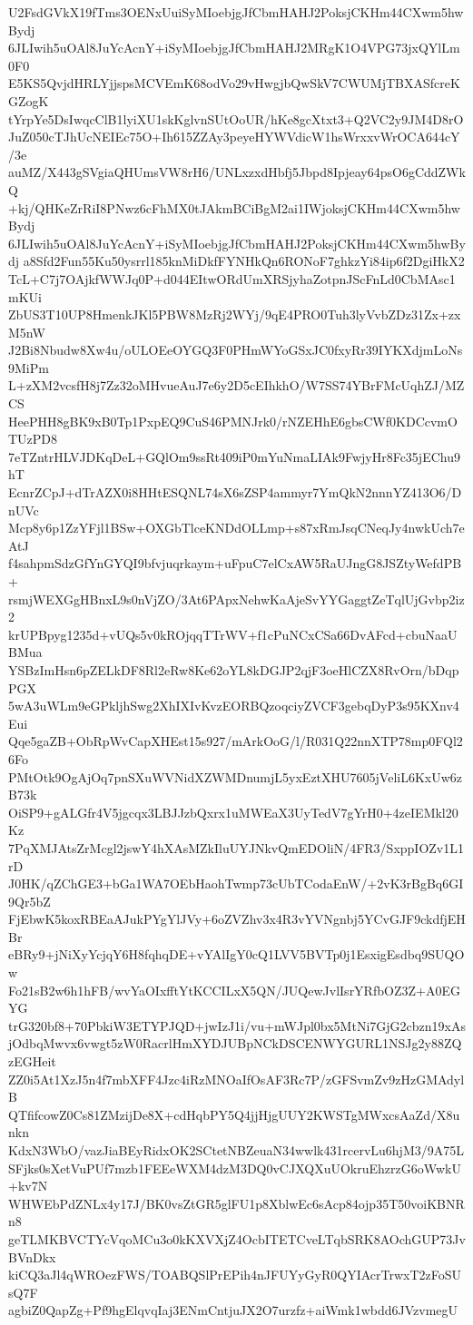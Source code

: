 U2FsdGVkX19fTms3OENxUuiSyMIoebjgJfCbmHAHJ2PoksjCKHm44CXwm5hwBydj
6JLIwih5uOAl8JuYcAcnY+iSyMIoebjgJfCbmHAHJ2MRgK1O4VPG73jxQYlLm0F0
E5KS5QvjdHRLYjjspsMCVEmK68odVo29vHwgjbQwSkV7CWUMjTBXASfcreKGZogK
tYrpYe5DsIwqcClB1lyiXU1skKglvnSUtOoUR/hKe8gcXtxt3+Q2VC2y9JM4D8rO
JuZ050cTJhUcNEIEc75O+Ih615ZZAy3peyeHYWVdicW1hsWrxxvWrOCA644cY/3e
auMZ/X443gSVgiaQHUmsVW8rH6/UNLxzxdHbfj5Jbpd8Ipjeay64psO6gCddZWkQ
+kj/QHKeZrRiI8PNwz6cFhMX0tJAkmBCiBgM2ai1IWjoksjCKHm44CXwm5hwBydj
6JLIwih5uOAl8JuYcAcnY+iSyMIoebjgJfCbmHAHJ2PoksjCKHm44CXwm5hwBydj
a8Sfd2Fun55Ku50ysrrl185knMiDkfFYNHkQn6RONoF7ghkzYi84ip6f2DgiHkX2
TcL+C7j7OAjkfWWJq0P+d044EItwORdUmXRSjyhaZotpnJScFnLd0CbMAsc1mKUi
ZbUS3T10UP8HmenkJKl5PBW8MzRj2WYj/9qE4PRO0Tuh3lyVvbZDz31Zx+zxM5nW
J2Bi8Nbudw8Xw4u/oULOEeOYGQ3F0PHmWYoGSxJC0fxyRr39IYKXdjmLoNs9MiPm
L+zXM2vcsfH8j7Zz32oMHvueAuJ7e6y2D5cEIhkhO/W7SS74YBrFMcUqhZJ/MZCS
HeePHH8gBK9xB0Tp1PxpEQ9CuS46PMNJrk0/rNZEHhE6gbsCWf0KDCcvmOTUzPD8
7eTZntrHLVJDKqDeL+GQlOm9ssRt409iP0mYuNmaLIAk9FwjyHr8Fc35jEChu9hT
EcnrZCpJ+dTrAZX0i8HHtESQNL74sX6sZSP4ammyr7YmQkN2nnnYZ413O6/DnUVc
Mcp8y6p1ZzYFjl1BSw+OXGbTlceKNDdOLLmp+s87xRmJsqCNeqJy4nwkUch7eAtJ
f4sahpmSdzGfYnGYQI9bfvjuqrkaym+uFpuC7elCxAW5RaUJngG8JSZtyWefdPB+
rsmjWEXGgHBnxL9s0nVjZO/3At6PApxNehwKaAjeSvYYGaggtZeTqlUjGvbp2iz2
krUPBpyg1235d+vUQs5v0kROjqqTTrWV+f1cPuNCxCSa66DvAFcd+cbuNaaUBMua
YSBzImHsn6pZELkDF8Rl2eRw8Ke62oYL8kDGJP2qjF3oeHlCZX8RvOrn/bDqpPGX
5wA3uWLm9eGPkljhSwg2XhIXIvKvzEORBQzoqciyZVCF3gebqDyP3s95KXnv4Eui
Qqe5gaZB+ObRpWvCapXHEst15s927/mArkOoG/l/R031Q22nnXTP78mp0FQl26Fo
PMtOtk9OgAjOq7pnSXuWVNidXZWMDnumjL5yxEztXHU7605jVeliL6KxUw6zB73k
OiSP9+gALGfr4V5jgcqx3LBJJzbQxrx1uMWEaX3UyTedV7gYrH0+4zeIEMkl20Kz
7PqXMJAtsZrMcgl2jswY4hXAsMZkIluUYJNkvQmEDOliN/4FR3/SxppIOZv1L1rD
J0HK/qZChGE3+bGa1WA7OEbHaohTwmp73cUbTCodaEnW/+2vK3rBgBq6GI9Qr5bZ
FjEbwK5koxRBEaAJukPYgYlJVy+6oZVZhv3x4R3vYVNgnbj5YCvGJF9ckdfjEHBr
eBRy9+jNiXyYcjqY6H8fqhqDE+vYAlIgY0cQ1LVV5BVTp0j1EsxigEsdbq9SUQOw
Fo21sB2w6h1hFB/wvYaOIxfftYtKCCILxX5QN/JUQewJvlIsrYRfbOZ3Z+A0EGYG
trG320bf8+70PbkiW3ETYPJQD+jwIzJ1i/vu+mWJpl0bx5MtNi7GjG2cbzn19xAs
jOdbqMwvx6vwgt5zW0RacrlHmXYDJUBpNCkDSCENWYGURL1NSJg2y88ZQzEGHeit
ZZ0i5At1XzJ5n4f7mbXFF4Jzc4iRzMNOaIfOsAF3Rc7P/zGFSvmZv9zHzGMAdylB
QTfifcowZ0Cs81ZMzijDe8X+cdHqbPY5Q4jjHjgUUY2KWSTgMWxcsAaZd/X8unkn
KdxN3WbO/vazJiaBEyRidxOK2SCtetNBZeuaN34wwlk431rcervLu6hjM3/9A75L
SFjks0sXetVuPUf7mzb1FEEeWXM4dzM3DQ0vCJXQXuUOkruEhzrzG6oWwkU+kv7N
WHWEbPdZNLx4y17J/BK0vsZtGR5glFU1p8XblwEc6sAcp84ojp35T50voiKBNRn8
geTLMKBVCTYcVqoMCu3o0kKXVXjZ4OcbITETCveLTqbSRK8AOchGUP73JvBVnDkx
kiCQ3aJl4qWROezFWS/TOABQSlPrEPih4nJFUYyGyR0QYIAcrTrwxT2zFoSUsQ7F
agbiZ0QapZg+Pf9hgElqvqIaj3ENmCntjuJX2O7urzfz+aiWmk1wbdd6JVzvmegU
